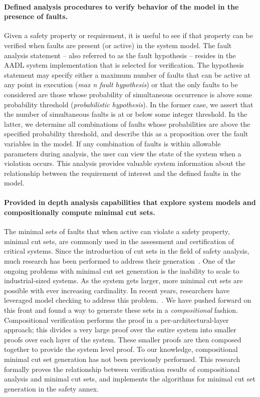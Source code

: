 \paragraph{Defined analysis procedures to verify behavior of the model in the presence of faults.}
Given a safety property or requirement, it is useful to see if that property can be verified when faults are present (or active) in the system model. The fault analysis statement -- also referred to as the fault hypothesis -- resides in the AADL system implementation that is selected for verification. The hypothesis statement may specify either a maximum number of faults that can be active at any point in execution (\emph{max n fault hypothesis}) or that the only faults to be considered are those whose probability of simultaneous occurrence is above some probability threshold (\emph{probabilistic hypothesis}).  In the former case, we assert that the number of simultaneous faults is at or below some integer threshold.  In the latter, we determine all combinations of faults whose probabilities are above the specified probability threshold, and describe this as a proposition over the fault variables in the model. If any combination of faults is within allowable parameters during analysis, the user can view the state of the system when a violation occurs. This analysis provides valuable system information about the relationship between the requirement of interest and the defined faults in the model. 

\paragraph{Provided in depth analysis capabilities that explore system models and compositionally compute minimal cut sets.}
The minimal sets of faults that when active can violate a safety property, minimal cut sets, are commonly used in the assessment and certification of critical systems. Since the introduction of cut sets in the field of safety analysis, much research has been performed to address their generation~\cite{fta:survey,rauzy1993new,historyFTA,Bozzano:2010:DSA:1951720,rausand2003system}. One of the ongoing problems with minimal cut set generation is the inability to scale to industrial-sized systems. As the system gets larger, more minimal cut sets are possible with ever increasing cardinality. In recent years, researchers have leveraged model checking to address this problem.~\cite{bieber2002combination,schafer2003combining,fta:survey,contractBasedDesign,symbFTA,DBLP:conf/cav/BozzanoCPJKPRT15}. We have pushed forward on this front and found a way to generate these sets in a \emph{compositional} fashion. Compositional verification performs the proof in a per-architectural-layer approach; this divides a very large proof over the entire system into smaller proofs over each layer of the system. These smaller proofs are then composed together to provide the system level proof. To our knowledge, compositional minimal cut set generation has not been previously performed. This research formally proves the relationship between verification results of compositional analysis and minimal cut sets, and implements the algorithms for minimal cut set generation in the safety annex.

